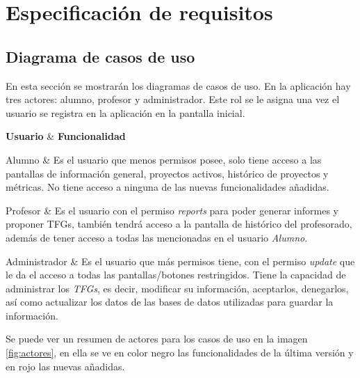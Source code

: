 \section{Especificación de requisitos}

\subsection{Diagrama de casos de uso}
En esta sección se mostrarán los diagramas de casos de uso. En la aplicación hay tres actores: alumno, profesor y administrador.
Este rol se le asigna una vez el usuario se registra en la aplicación en la pantalla inicial. 


{\textbf{Usuario} & \textbf{Funcionalidad} \\}{
	Alumno & Es el usuario que menos permisos posee, solo tiene acceso a las pantallas de información general, proyectos activos, histórico de proyectos y métricas. No tiene acceso a ninguna de las nuevas funcionalidades añadidas. \\\hline
	
	Profesor & Es el usuario con el permiso \emph{reports} para poder generar informes y proponer TFGs, también tendrá acceso a la pantalla de histórico del profesorado, además de tener acceso a todas las mencionadas en el usuario \emph{Alumno}. \\\hline
	
	Administrador & Es el usuario que más permisos tiene, con el permiso \emph{update} que le da el acceso a todas las pantallas/botones restringidos. Tiene la capacidad de administrar los \emph{TFGs}, es decir, modificar su información, aceptarlos, denegarlos, así como actualizar los datos de las bases de datos utilizadas para guardar la información. \\
}
Se puede ver un resumen de actores para los casos de uso en la imagen \ref{fig:actores}, en ella se ve en color negro las funcionalidades de la última versión y en rojo las nuevas añadidas.

